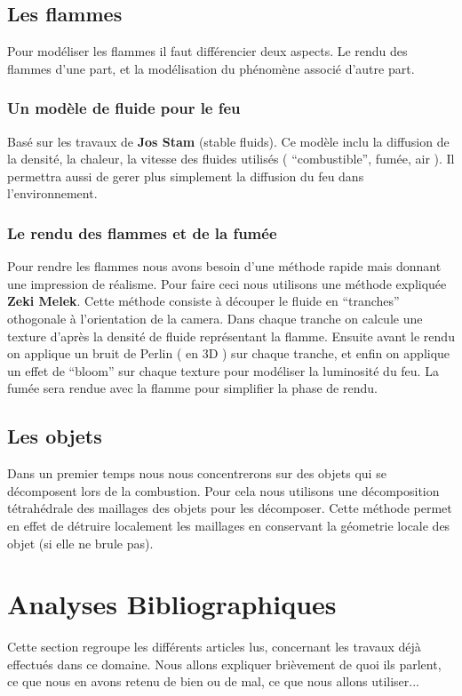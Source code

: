 \documentclass[a4paper,10pt]{article}
\begin{document}
\subsection{Les flammes}
Pour modéliser les flammes il faut différencier deux aspects. Le rendu
des flammes d'une part, et la modélisation du phénomène associé
d'autre part.

\subsubsection{Un modèle de fluide pour le feu}
Basé sur les travaux de \textbf{Jos Stam} (stable fluids). Ce modèle inclu la
diffusion de la densité, la chaleur, la vitesse des fluides utilisés (
``combustible'', fumée, air ). Il permettra aussi de gerer plus
simplement la diffusion du feu dans l'environnement.

\subsubsection{Le rendu des flammes et de la fumée}
Pour rendre les flammes nous avons besoin d'une méthode rapide mais
donnant une impression de réalisme. Pour faire ceci nous utilisons une
méthode expliquée \textbf{Zeki Melek}. Cette méthode consiste à
découper le fluide en ``tranches'' othogonale à l'orientation de la
camera. Dans chaque tranche on calcule une texture d'après la densité
de fluide représentant la flamme. Ensuite avant le rendu on applique
un bruit de Perlin ( en 3D ) sur chaque tranche, et enfin on applique
un effet de ``bloom'' sur chaque texture pour modéliser la luminosité
du feu. La fumée sera rendue avec la flamme pour simplifier la phase
de rendu.

\subsection{Les objets}
Dans un premier temps nous nous concentrerons sur des objets qui se
décomposent lors de la combustion. Pour cela nous utilisons une
décomposition tétrahédrale des maillages des objets pour les
décomposer. Cette méthode permet en effet de détruire localement les
maillages en conservant la géometrie locale des objet (si elle ne
brule pas).



\section{Analyses Bibliographiques}
Cette section regroupe les différents articles lus, concernant les travaux déjà effectués dans ce domaine. 
Nous allons expliquer brièvement de quoi ils parlent, ce que nous en avons retenu de bien ou de mal, ce que nous allons 
utiliser...
\end{document}
